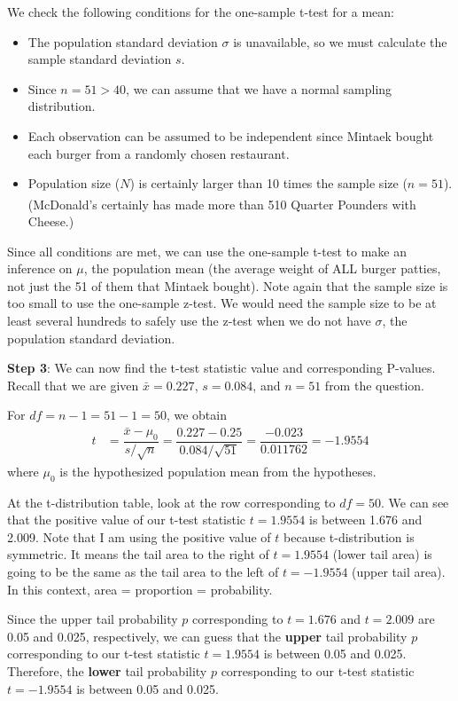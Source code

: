 \documentclass[12pt]{article}
\begin{document}
We check the following conditions for the one-sample t-test for a mean:
\begin{itemize}
	\item The population standard deviation $\sigma$ is unavailable, so we must calculate the sample standard deviation $s$.
	\item Since $n = 51 > 40$, we can assume that we have a normal sampling distribution.
	\item Each observation can be assumed to be independent since Mintaek bought each burger from a randomly chosen restaurant.
	\item Population size ($N$) is certainly larger than 10 times the sample size ($n=51$). \\
	(McDonald's certainly has made more than 510 Quarter Pounders\textsuperscript{\textregistered} with Cheese.)
\end{itemize}
Since all conditions are met, we can use the one-sample t-test to make an inference on $\mu$, the population mean (the average weight of ALL burger patties, not just the 51 of them that Mintaek bought). Note again that the sample size is too small to use the one-sample z-test. We would need the sample size to be at least several hundreds to safely use the z-test when we do not have $\sigma$, the population standard deviation.

\noindent \textbf{Step 3}: We can now find the t-test statistic value and corresponding P-values. Recall that we are given $\bar{x} = 0.227$, $s = 0.084$, and $n=51$ from the question.

For $df = n - 1 = 51 - 1 = 50$, we obtain
\begin{align*}
t &= \dfrac{\bar{x} - \mu_0}{s / \sqrt{n}} 
= \dfrac{0.227 - 0.25}{0.084 / \sqrt{51}}
= \dfrac{-0.023}{0.011762}
= -1.9554
\end{align*}
where $\mu_0$ is the hypothesized population mean from the hypotheses.

At the t-distribution table, look at the row corresponding to $df = 50$. We can see that the positive value of our t-test statistic $t = 1.9554$ is between 1.676 and 2.009. Note that I am using the positive value of $t$ because t-distribution is symmetric. It means the tail area to the right of $t = 1.9554$ (lower tail area) is going to be the same as the tail area to the left of $t = -1.9554$ (upper tail area). In this context, area = proportion = probability.

Since the upper tail probability $p$ corresponding to $t = 1.676$ and $t = 2.009$ are 0.05 and 0.025, respectively, we can guess that the \textbf{upper} tail probability $p$ corresponding to our t-test statistic $t = 1.9554$ is between 0.05 and 0.025. Therefore, the \textbf{lower} tail probability $p$ corresponding to our t-test statistic $t = -1.9554$ is between 0.05 and 0.025.
\end{document}
